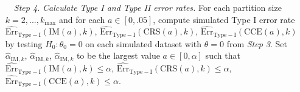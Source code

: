\documentclass[preprint]{imsart}
\numberwithin{equation}{section}
\theoremstyle{plain}
\theoremstyle{definition}
\renewcommand{\(}{\left(}
\renewcommand{\)}{\right)}
\renewcommand{\[}{\left[}
\renewcommand{\]}{\right]}
\renewcommand{\hat}{\widehat}
\newcommand{\G}{k}
\renewcommand{\hat}{\widehat}
\renewcommand{\leq}{\leqslant}
\renewcommand{\diamond}{b}
\begin{document}
{\begin{enumerate}
\begin{itemize}
		\item In the IV model, draw $(U^\diamond,V^\diamond)$ such that 
		$$\begin{pmatrix}
			U^\diamond \\ V^\diamond
		\end{pmatrix}\sim \mathrm N\left( 0, \begin{bmatrix}
			\widehat{\Sigma}_U & \widehat{\rho}\widehat{\Sigma}_U^{1/2}(\widehat{\Sigma}_V^{1/2})'\\
			\widehat{\rho}\widehat{\Sigma}_V^{1/2}(\widehat{\Sigma}_U^{1/2})' & \widehat{\Sigma}_V
		\end{bmatrix}\right).$$
		Reproduce data by 
		\begin{equation*}
			\begin{cases}
				Y_{de}^\diamond=\widehat{\alpha}+\theta X_{de}^\diamond+W_{de}'\widehat{\gamma}+U_{de}^\diamond\\
				X_{de}^\diamond=\widehat{\mu}+\widehat{\pi}Z_{de}+X_{de}'\widehat{\xi}+V_{de}^\diamond
			\end{cases},
		\end{equation*}
		where $\widehat{\alpha}$ and $\widehat{\gamma}$ are full-sample 2SLS estimators, $\widehat{\mu}$, $\widehat{\pi}$, $\widehat{\xi}$ are full-sample least-square estimators for the first-stage equation, and $U_{de}^\diamond$, and $V_{de}^\diamond$ are respectively the $de$ elements of $U^\diamond$ and $V^\diamond$. 
		
	\end{itemize}	
	\item[ \ \ \textit{Step 4.}] \textit{Calculate Type I and Type II error rates.}	For each partition size $\G=2,...,\G_{\max}$ and for each $a \in [0,.05]$,  compute simulated Type I error rate 
	$ \widehat {\mathrm{Err}}_{\mathrm{Type-I}}(\mathrm{IM}(a), \G )$, 
	$ \widehat {\mathrm{Err}}_{\mathrm{Type-I}}(\mathrm{CRS}(a), \G)$, 
	$ \widehat {\mathrm{Err}}_{\mathrm{Type-I}}(\mathrm{CCE}(a),\G)$ by testing $H_0:\theta_0=0$ on each simulated dataset with $\theta=0$ from \textit{Step 3}.  
	Set $\hat \alpha_{\text{IM}, \G}$, $\hat \alpha_{\text{IM}, \G}$, $\hat \alpha_{\text{IM}, \G}$ to be the largest value $ a \in [0, \alpha]$ such that  
	$\widehat {\mathrm{Err}}_{\mathrm{Type-I}}(\mathrm{IM}(a),\G)\leq \alpha$, 
	$\widehat {\mathrm{Err}}_{\mathrm{Type-I}}(\mathrm{CRS}(a),\G)\leq \alpha$,
	$\widehat {\mathrm{Err}}_{\mathrm{Type-I}}(\mathrm{CCE}(a),\G)\leq \alpha$. 
	
	

\end{enumerate}}
\end{document}
